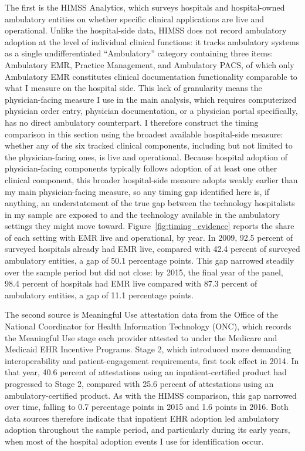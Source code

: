 \documentclass[12pt]{article}
\begin{document}
The first is the HIMSS Analytics, which surveys hospitals
and hospital-owned ambulatory entities on whether specific clinical applications
are live and operational. Unlike the hospital-side data, HIMSS does not record
ambulatory adoption at the level of individual clinical functions: it tracks
ambulatory systems as a single undifferentiated ``Ambulatory'' category
containing three items: Ambulatory EMR, Practice Management, and Ambulatory
PACS, of which only Ambulatory EMR constitutes clinical documentation
functionality comparable to what I measure on the hospital side. This lack of
granularity means the physician-facing measure I use in the main analysis, which
requires computerized physician order entry, physician documentation, or a
physician portal specifically, has no direct ambulatory counterpart. I therefore
construct the timing comparison in this section using the broadest available
hospital-side measure: whether any of the six tracked clinical components,
including but not limited to the physician-facing ones, is live and
operational. Because hospital adoption of
physician-facing components typically follows adoption of at least one other
clinical component, this broader hospital-side measure adopts weakly earlier
than my main physician-facing measure, so any timing gap identified here is, if
anything, an understatement of the true gap between the technology hospitalists
in my sample are exposed to and the technology available in the ambulatory
settings they might move toward. Figure~\ref{fig:timing_evidence} reports the
share of each setting with EMR live and operational, by year. In 2009, 92.5 percent of surveyed hospitals already had EMR live,
compared with 42.4 percent of surveyed ambulatory entities, a gap of 50.1
percentage points. This gap narrowed steadily over the sample period but did not
close: by 2015, the final year of the panel, 98.4 percent of hospitals had EMR
live compared with 87.3 percent of ambulatory entities, a gap of 11.1 percentage
points.


The second source is Meaningful Use attestation data from the Office of the
National Coordinator for Health Information Technology (ONC), which records the
Meaningful Use stage each provider attested to under the Medicare and Medicaid
EHR Incentive Programs. Stage 2, which introduced more demanding interoperability
and patient-engagement requirements, first took effect in 2014. In that year,
40.6 percent of attestations using an inpatient-certified product had progressed
to Stage 2, compared with 25.6 percent of attestations using an
ambulatory-certified product. As with the HIMSS comparison, this gap narrowed
over time, falling to 0.7 percentage points in 2015 and 1.6 points in 2016. Both
data sources therefore indicate that inpatient EHR adoption led ambulatory
adoption throughout the sample period, and particularly during its early years,
when most of the hospital adoption events I use for identification occur.
\end{document}
